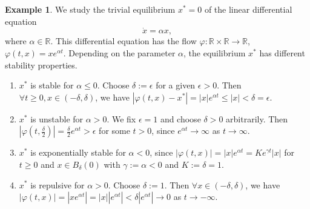 \documentclass[12pt]{report}
\theoremstyle{definition}
\begin{document}
\newtheorem{stability of 1d linear DE}[theorem]{Example}
\begin{stability of 1d linear DE}
    We study the trivial equilibrium $x^*=0$ of the linear differential equation
    \[
        \dot{x}=\alpha x,
    \]
    where $\alpha\in\mathbb{R}$. This differential equation has the flow
    $\varphi:\mathbb{R}\times\mathbb{R}\rightarrow\mathbb{R}$,
    $\varphi(t,x)=xe^{\alpha t}$. Depending on the parameter $\alpha$,
    the equilibrium $x^{*}$ has different stability properties.
    \begin{enumerate}[label = (\roman*)]
        \item $x^*$ is stable for $\alpha\le 0$. Choose $\delta:=\epsilon$
            for a given $\epsilon>0$. Then $\forall t\ge 0, x\in(-\delta,\delta)$,
            we have $|\varphi(t,x)-x^{*}|=|x|e^{\alpha t}\le|x|<\delta=\epsilon$.
        \item $x^{*}$ is unstable for $\alpha>0$. We fix $\epsilon=1$
            and choose $\delta>0$ arbitrarily. Then 
            $|\varphi(t,\frac{\delta}{2})|=\frac{\delta}{2}e^{\alpha t}>\epsilon$
            for some $t>0$, since $e^{\alpha t}\rightarrow\infty$
            as $t\rightarrow\infty$.
        \item $x^*$ is exponentially stable for $\alpha<0$, since
            $|\varphi(t,x)|=|x|e^{\alpha t}=Ke^{\gamma t}|x|$
            for $t\ge 0$ and $x\in B_\delta(0)$
            with $\gamma:=\alpha<0$ and $K:=\delta=1$.
        \item $x^*$ is repulsive for $\alpha>0$.
            Choose $\delta:=1$.
            Then $\forall x\in(-\delta, \delta)$,
            we have $|\varphi(t,x)|=|xe^{\alpha t}|=|x| |e^{\alpha t}|
            < \delta|e^{\alpha t}| \rightarrow 0$ as $t\rightarrow-\infty$.
    \end{enumerate} 
\end{stability of 1d linear DE}
\end{document}
